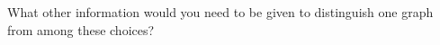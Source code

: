 \documentclass{ximera}
\begin{document}
\begin{exercise}
	\begin{exercise}
		What other information would you need to be given to distinguish one graph from among these choices?
		\begin{multipleChoice}
		\end{multipleChoice}
	\end{exercise}

\end{exercise}
\end{document}
